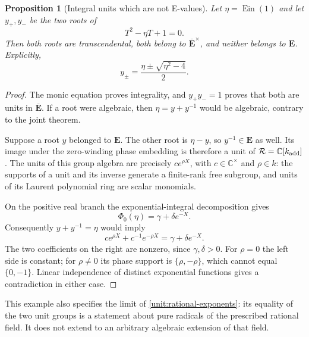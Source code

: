 \documentclass[11pt]{article}
\newtheorem{proposition}[theorem]{Proposition}
\theoremstyle{definition}
\theoremstyle{remark}
\newcommand{\E}{\mathbf E}
\newcommand{\Ebar}{\overline{\mathbf E}}
\newcommand{\Ein}{\operatorname{Ein}}
\begin{document}
\begin{proposition}[Integral units which are not E-values]
\label{unit:quadratic-boundary}
Let $\eta=\Ein(1)$ and let $y_+,y_-$ be the two roots of
\[
                         T^2-\eta T+1=0.
\]
Then both roots are transcendental, both belong to $\Ebar^\times$,
and neither belongs to $\E$. Explicitly,
\[
                    y_\pm=\frac{\eta\pm\sqrt{\eta^2-4}}2.
\]
\end{proposition}
\begin{proof}
The monic equation proves integrality, and $y_+y_-=1$ proves that
both are units in $\Ebar$. If a root were algebraic, then
$\eta=y+y^{-1}$ would be algebraic, contrary to the joint theorem.

Suppose a root $y$ belonged to $\E$. The other root is $\eta-y$,
so $y^{-1}\in\E$ as well. Its image under the zero-winding phase
embedding is therefore a unit of
$\mathcal R=\mathbb C[k_{\rm add}]$. The units of this group
algebra are precisely $c e^{\rho X}$, with $c\in\mathbb C^\times$
and $\rho\in k$: the supports of a unit and its inverse generate
a finite-rank free subgroup, and units of its Laurent polynomial ring
are scalar monomials.

On the positive real branch the exponential-integral decomposition gives
\[
                  \Phi_0(\eta)=\gamma+\delta e^{-X}.
\]
Consequently $y+y^{-1}=\eta$ would imply
\[
                c e^{\rho X}+c^{-1}e^{-\rho X}
                      =\gamma+\delta e^{-X}.
\]
The two coefficients on the right are nonzero, since $\gamma,\delta>0$.
For $\rho=0$ the left side is constant; for $\rho\ne0$ its phase
support is $\{\rho,-\rho\}$, which cannot equal $\{0,-1\}$.
Linear independence of distinct exponential functions gives a
contradiction in either case.
\end{proof}

This example also specifies the limit of
\eqref{unit:rational-exponents}: its equality of the two unit groups
is a statement about pure radicals of the prescribed rational field.
It does not extend to an arbitrary algebraic extension of that field.
\end{document}
